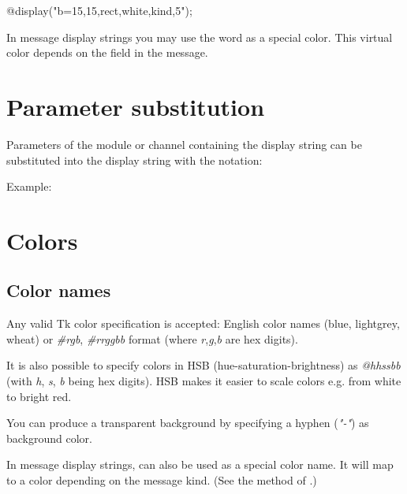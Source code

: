 \begin{ned}
@display("b=15,15,rect,white,kind,5");
\end{ned}

\begin{note}
   In message display strings you may use the word  as a special color.
   This virtual color depends on the  field in the message.
\end{note}



\section{Parameter substitution}

Parameters of the module or channel containing the
display string can be substituted into the display string
with the  notation:

Example:


\section{Colors}
\label{sec:ch-graphics:colors}

\subsection{Color names}

Any valid Tk color specification is accepted: English color names
(blue, lightgrey, wheat) or \textit{\#rgb}, \textit{\#rrggbb} format
(where \textit{r},\textit{g},\textit{b} are hex digits).

It is also possible to specify colors in HSB (hue-saturation-brightness) as
\textit{@hhssbb} (with \textit{h}, \textit{s}, \textit{b} being hex digits).
HSB makes it easier to scale colors e.g. from white to bright red.

You can produce a transparent background by specifying a hyphen (\textit{"-"})
as background color.

In message display strings,  can also be used as a special color name.
It will map to a color depending on the message kind.
(See the  method of .)

